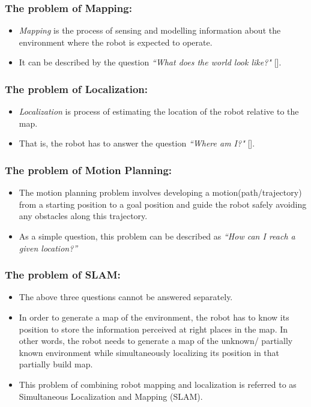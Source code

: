 \subsubsection{The problem of Mapping:}
\begin{itemize}
 \item \textit{Mapping} is the process of sensing and modelling information about the environment where the robot is expected to operate. 
 \item It can be described by the question \textit{``What does the world look like?"} [].\\
\end{itemize}

\subsubsection{The problem of Localization:}
\begin{itemize}
 \item \textit{Localization} is process of estimating the location of the robot relative to the map. 
 \item That is, the robot has to answer the question \textit{``Where am I?"} [].\\
\end{itemize}

\subsubsection{The problem of Motion Planning:}
\begin{itemize}
 \item The motion planning problem involves developing a motion(path/trajectory) from a starting position to a goal position and guide the robot safely avoiding any obstacles along this trajectory.
 \item As a simple question, this problem can be described as \textit{``How can I reach a given location?”} 
\end{itemize}

\subsubsection{The problem of SLAM:}
\begin{itemize}    
 \item The above three questions cannot be answered separately. 
 \item In order to generate a map of the environment, the robot has to know its position to store the information perceived at right places in the map. In other words, the robot needs to generate a map of the unknown/ partially known 
environment while simultaneously localizing its position in that partially build map. 
 \item This problem of combining robot mapping and localization is referred to as Simultaneous Localization and Mapping (SLAM).
\end{itemize}

